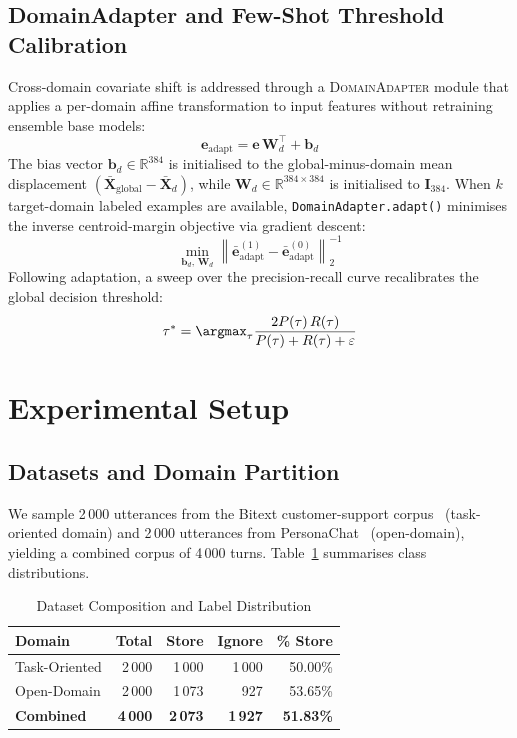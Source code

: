\documentclass[conference]{IEEEtran}
\begin{document}
\subsection{DomainAdapter and Few-Shot Threshold Calibration}
Cross-domain covariate shift is addressed through a
\textsc{DomainAdapter} module that applies a per-domain
affine transformation to input features without retraining
ensemble base models:
\begin{equation}
  \mathbf{e}_{\mathrm{adapt}} = \mathbf{e}\,\mathbf{W}_d^\top + \mathbf{b}_d
\end{equation}
The bias vector $\mathbf{b}_d \in \mathbb{R}^{384}$ is
initialised to the global-minus-domain mean displacement
$(\bar{\mathbf{X}}_{\mathrm{global}} - \bar{\mathbf{X}}_d)$,
while $\mathbf{W}_d \in \mathbb{R}^{384 \times 384}$ is
initialised to $\mathbf{I}_{384}$.
When $k$ target-domain labeled examples are available,
\texttt{DomainAdapter.adapt()} minimises the inverse
centroid-margin objective via gradient descent:
\begin{equation}
  \min_{\mathbf{b}_d,\,\mathbf{W}_d}
  \left\|
    \bar{\mathbf{e}}_{\mathrm{adapt}}^{(1)} -
    \bar{\mathbf{e}}_{\mathrm{adapt}}^{(0)}
  \right\|_2^{-1}
\end{equation}
Following adaptation, a sweep over the precision-recall curve
recalibrates the global decision threshold:
\begin{equation}
  \tau^* = \argmax_{\tau}
  \frac{2 P(\tau)\,R(\tau)}{P(\tau)+R(\tau)+\varepsilon}
\end{equation}

\section{Experimental Setup}

\subsection{Datasets and Domain Partition}
We sample 2\,000 utterances from the Bitext customer-support
corpus~\cite{bitext2023} (task-oriented domain) and 2\,000
utterances from PersonaChat~\cite{zhang2018personachat}
(open-domain), yielding a combined corpus of 4\,000 turns.
Table~\ref{tab:dataset} summarises class distributions.

\begin{table}[h!]
  \centering
  \caption{Dataset Composition and Label Distribution}
  \label{tab:dataset}
  \renewcommand{\arraystretch}{1.15}
  \begin{tabular}{@{}lrrrr@{}}
    \toprule
    \textbf{Domain} & \textbf{Total} & \textbf{Store} & \textbf{Ignore} & \textbf{\% Store} \\
    \midrule
    Task-Oriented & 2\,000 & 1\,000 & 1\,000 & 50.00\% \\
    Open-Domain   & 2\,000 & 1\,073 &   927  & 53.65\% \\
    \midrule
    \textbf{Combined} & \textbf{4\,000} & \textbf{2\,073} & \textbf{1\,927} & \textbf{51.83\%} \\
    \bottomrule
  \end{tabular}
\end{table}
\end{document}

